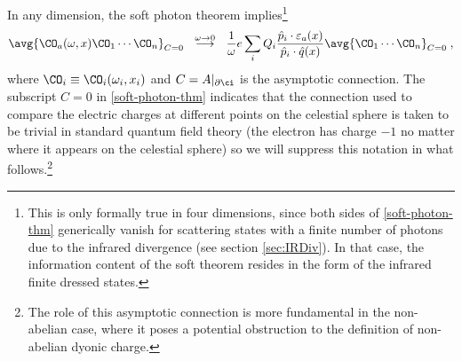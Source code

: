 \documentclass[11pt]{article}
\def\o{{\omega}}
\def\ve{{\varepsilon}}
\def\p{{\partial}}
\begin{document}
In any dimension, the soft photon theorem implies\footnote{This is only formally true in four dimensions, since both sides of \eqref{soft-photon-thm} generically vanish for scattering states with a finite number of photons due to the infrared divergence (see section \ref{sec:IRDiv}). In that case, the information content of the soft theorem resides in the form of the infrared finite dressed states.}
\begin{equation}
\begin{split}\label{soft-photon-thm}
\avg{ \CO_a ( \o , x ) \CO_1 \cdots \CO_n }_{C=0} ~~ \stackrel{\o\to0}{\longrightarrow} ~~ \frac{1}{\o} e \sum_i Q_i \frac{ {\hat p}_i \cdot \ve_a(x) }{ {\hat p}_i \cdot {\hat q}(x)  } \avg{ \CO_1 \cdots \CO_n }_{C=0}  \;  , 
\end{split}
\end{equation}
where $\CO_i \equiv \CO_i(\o_i,x_i)$ and $C = A |_{\p\ci}$ is the asymptotic connection. The subscript $C=0$ in \eqref{soft-photon-thm} indicates that the connection used to compare the electric charges at different points on the celestial sphere is taken to be trivial in standard quantum field theory (the electron has charge $-1$ no matter where it appears on the celestial sphere) so we will suppress this notation in what follows.\footnote{The role of this asymptotic connection is more fundamental in the non-abelian case, where it poses a potential obstruction to the definition of non-abelian dyonic charge.}
\end{document}
